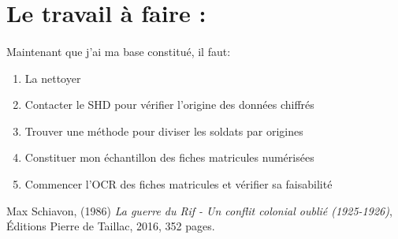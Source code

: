 \documentclass[12pt]{article}
\begin{document}
\section{Le travail à faire :}
\paragraph*{}
Maintenant que j'ai ma base constitué, il faut: \begin{enumerate}
\item La nettoyer
\item Contacter le SHD pour vérifier l'origine des données chiffrés 
\item Trouver une méthode pour diviser les soldats par origines 
\item Constituer mon échantillon des fiches matricules numérisées
\item Commencer l'OCR des fiches matricules et vérifier sa faisabilité
\end{enumerate}


\listoffigures

\begin{thebibliography}{1}
Max Schiavon, (1986) \emph{La guerre du Rif - Un conflit colonial oublié (1925-1926)}, Éditions Pierre de Taillac, 2016, 352 pages.
\end{thebibliography}
\end{document}
